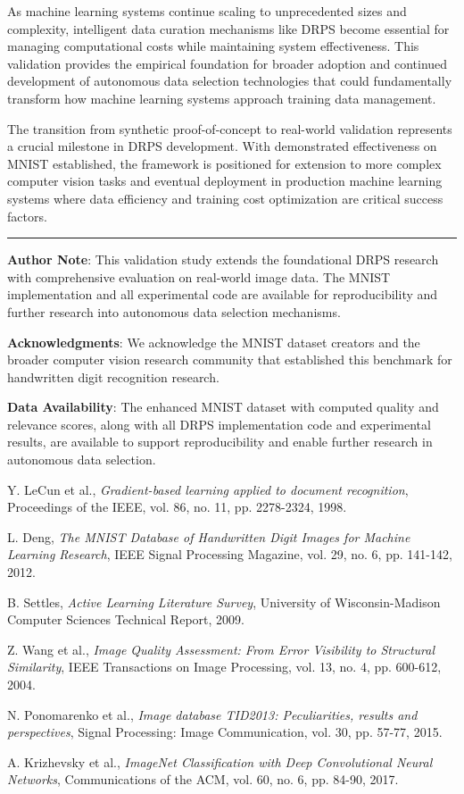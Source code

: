 \documentclass[12pt]{article}
\begin{document}
As machine learning systems continue scaling to unprecedented sizes and complexity, intelligent data curation mechanisms like DRPS become essential for managing computational costs while maintaining system effectiveness. This validation provides the empirical foundation for broader adoption and continued development of autonomous data selection technologies that could fundamentally transform how machine learning systems approach training data management.

The transition from synthetic proof-of-concept to real-world validation represents a crucial milestone in DRPS development. With demonstrated effectiveness on MNIST established, the framework is positioned for extension to more complex computer vision tasks and eventual deployment in production machine learning systems where data efficiency and training cost optimization are critical success factors.

\begin{center}\rule{0.5\linewidth}{0.5pt}\end{center}

\textbf{Author Note}: This validation study extends the foundational DRPS research with comprehensive evaluation on real-world image data. The MNIST implementation and all experimental code are available for reproducibility and further research into autonomous data selection mechanisms.

\textbf{Acknowledgments}: We acknowledge the MNIST dataset creators and the broader computer vision research community that established this benchmark for handwritten digit recognition research.

\textbf{Data Availability}: The enhanced MNIST dataset with computed quality and relevance scores, along with all DRPS implementation code and experimental results, are available to support reproducibility and enable further research in autonomous data selection.

\begin{thebibliography}{9}
Y. LeCun et al.,
\textit{Gradient-based learning applied to document recognition},
Proceedings of the IEEE, vol. 86, no. 11, pp. 2278-2324, 1998.

L. Deng,
\textit{The MNIST Database of Handwritten Digit Images for Machine Learning Research},
IEEE Signal Processing Magazine, vol. 29, no. 6, pp. 141-142, 2012.

B. Settles,
\textit{Active Learning Literature Survey},
University of Wisconsin-Madison Computer Sciences Technical Report, 2009.

Z. Wang et al.,
\textit{Image Quality Assessment: From Error Visibility to Structural Similarity},
IEEE Transactions on Image Processing, vol. 13, no. 4, pp. 600-612, 2004.

N. Ponomarenko et al.,
\textit{Image database TID2013: Peculiarities, results and perspectives},
Signal Processing: Image Communication, vol. 30, pp. 57-77, 2015.

A. Krizhevsky et al.,
\textit{ImageNet Classification with Deep Convolutional Neural Networks},
Communications of the ACM, vol. 60, no. 6, pp. 84-90, 2017.
\end{thebibliography}
\end{document}
